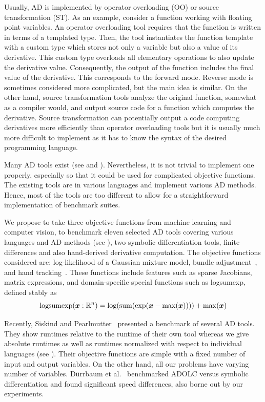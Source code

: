 \documentclass[suppldata]{article}
\begin{document}
Usually, AD is implemented by operator overloading (OO) or source transformation (ST). As an example, consider a \Cpp{} function working with floating point variables. An operator overloading tool requires that the function is written in terms of a templated type. Then, the tool instantiates the function template with a custom type which stores not only a variable but also a value of its derivative. This custom type overloads all elementary operations to also update the derivative value. Consequently, the output of the function includes the final value of the derivative.  This corresponds to the forward mode.  Reverse mode is sometimes considered more complicated, but the main idea is similar.  On the other hand, source transformation tools analyze the original function, somewhat as a compiler would, and output source code for a function which computes the derivative. Source transformation can potentially output a code computing derivatives more efficiently than operator overloading tools but it is usually much more difficult to implement as it has to know the syntax of the desired programming language.

Many AD tools exist (see \cite{autodiff-org} and ). Nevertheless, it is not trivial to implement one properly, especially so that it could be used for complicated objective functions. The existing tools are in various languages and implement various AD methods. Hence, most of the tools are too different to allow for a straightforward implementation of benchmark suites. 

We propose to take three objective functions from machine learning and computer vision, to benchmark eleven selected AD tools covering various languages and AD methods (see ), two symbolic differentiation tools, finite differences and also hand-derived derivative computation. The objective functions considered are: log-likelihood of a Gaussian mixture model, bundle adjustment~\cite{Triggs99ba}, and hand tracking~\cite{Taylor14hand}. These functions include features such as sparse Jacobians, matrix expressions, and domain-specific special functions such as logsumexp, defined stably as
\begin{equation}
\logsumexp(\vx : \mathbb R^n) = \log(\operatorname{sum}(\exp(\vx - \max(\vx)))) + \max(\vx)
\end{equation}

Recently, Siskind and Pearlmutter~\cite{Siskind16} presented a benchmark of several AD tools. They show runtimes relative to the runtime of their own tool whereas we give absolute runtimes as well as runtimes normalized with respect to individual languages (see ). Their objective functions are simple with a fixed number of input and output variables. On the other hand, all our problems have varying number of variables.  D{\"u}rrbaum et al.~\cite{Durrbaum02comparison} benchmarked ADOLC versus symbolic differentiation and found significant speed differences, also borne out by our experiments.
\end{document}
